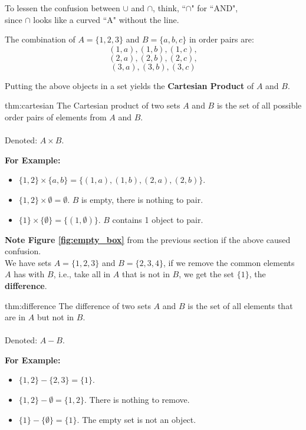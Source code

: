 \begin{Tip}
    To lessen the confusion between $\cup$ and $\cap$, think, ``$\cap$" for ``AND",\\
    since $\cap$ looks like a curved ``A" without the line.\\
\end{Tip}

\noindent
The combination of $A=\{1,2,3\}$ and $B=\{a,b,c\}$ in order pairs are:
$$(1,a), (1,b), (1,c), $$
$$(2,a), (2,b), (2,c), $$
$$(3,a), (3,b), (3,c)$$

\noindent
Putting the above objects in a set yields the \textbf{Cartesian Product} of $A$ and $B$.

\begin{theo}{thm:cartesian}
    The Cartesian product of two sets $A$ and $B$ is the set of all possible order
    pairs of elements from $A$ and $B$.\\\\
    Denoted: $A \times B$.
\end{theo}

\noindent
\textbf{For Example:}
\begin{itemize}
    \item $\{1, 2\} \times \{a, b\} = \{(1,a), (1,b), (2,a), (2,b)\}$.
    \item $\{1,2\} \times \emptyset = \emptyset$. $B$ is empty, there is nothing to pair.
    \item $\{1\} \times \{\emptyset\} = \{(1,\emptyset)\}$. $B$ contains 1 object to pair.
\end{itemize}
\textbf{Note Figure \ref{fig:empty_box}} from the previous section if the above caused confusion.\\

\noindent
We have sets $A=\{1,2,3\}$ and $B=\{2,3,4\}$, if we remove the common elements
$A$ has with $B$, i.e., take all in $A$ that is not in $B$, we get the set $\{1\}$, the \textbf{difference}.\\

\begin{theo}[Difference]{thm:difference}
    The difference of two sets $A$ and $B$ is the set of all elements that are in $A$ but not in $B$.\\\\
    Denoted: $A - B$.
\end{theo}

\noindent
\textbf{For Example:}
\begin{itemize}
    \item $\{1, 2\} - \{2, 3\} = \{1\}$.
    \item $\{1,2\} - \emptyset = \{1, 2\}$. There is nothing to remove.
    \item $\{1\} - \{\emptyset\} = \{1\}$. The empty set is not an object.
\end{itemize}


